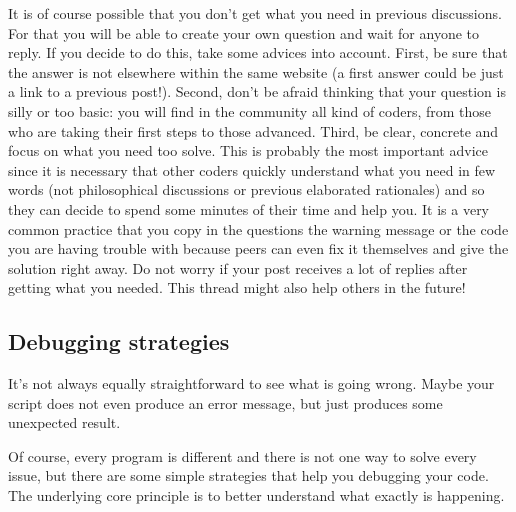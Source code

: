 It is of course possible that you don't get what you need in previous discussions. For that you will be able to create your own question and wait for anyone to reply. If you decide to do this, take some advices into account. First, be sure that the answer is not elsewhere within the same website (a first answer could be just a link to a previous post!). Second, don't be afraid thinking that your question is silly or too basic: you will find in the community all kind of coders, from those who are taking their first steps to those advanced. Third, be clear, concrete and focus on what you need too solve. This is probably the most important advice since it is necessary that other coders quickly understand what you need in few words (not philosophical discussions or previous elaborated rationales) and so they can decide to spend some minutes of their time and help you. It is a very common practice that you copy in the questions the warning message or the code you are having trouble with because peers can even fix it themselves and give the solution right away. Do not worry if your post receives a lot of replies after getting what you needed. This thread might also help others in the future!


\subsection{Debugging strategies}

It's not always equally straightforward to see what is going
wrong. Maybe your script does not even produce an error
message, but just produces some unexpected result.

Of course, every program is different and there is not one
way to solve every issue, but there are some simple strategies
that help you debugging your code. The underlying core
principle is to better understand what exactly is happening.

